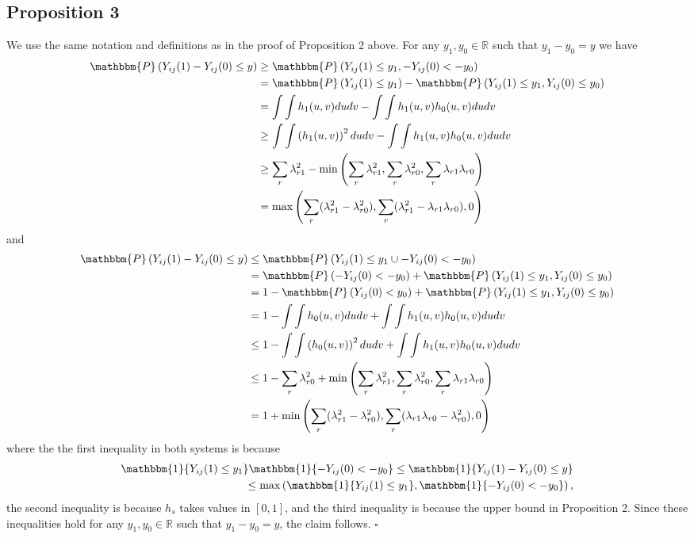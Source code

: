 \documentclass[12pt]{article}
\theoremstyle{definition}
\begin{document}
\subsection{Proposition 3}
We use the same notation and definitions as in the proof of Proposition 2 above. For any $y_{1},y_{0} \in \mathbb{R}$ such that $y_{1}-y_{0} = y$ we have
\begin{align*}
\mathbbm{P}\left(Y_{ij}(1) - Y_{ij}(0) \leq y\right) &\geq \mathbbm{P}\left(Y_{ij}(1) \leq y_1, -Y_{ij}(0) < -y_0\right)\\
&=  \mathbbm{P}\left(Y_{ij}(1) \leq y_1\right) -  \mathbbm{P}\left(Y_{ij}(1) \leq y_1, Y_{ij}(0) \leq  y_0\right)\\
&= \int\int h_{1}(u,v) dudv - \int\int h_{1}(u,v)h_{0}(u,v) dudv \\
&\geq \int\int \left(h_{1}(u,v)\right)^2 dudv - \int\int h_{1}(u,v)h_{0}(u,v) dudv \\
&\geq \sum_{r}\lambda_{r1}^{2} - \min\left(\sum_{r}\lambda_{r1}^{2},\sum_{r}\lambda_{r0}^{2},\sum_{r}\lambda_{r1}\lambda_{r0}\right) \\
&= \max\left(\sum_{r}(\lambda_{r1}^{2}-\lambda_{r0}^{2}),\sum_{r}(\lambda_{r1}^{2} - \lambda_{r1}\lambda_{r0}),0\right)
\end{align*}
and
\begin{align*}
\mathbbm{P}\left(Y_{ij}(1) - Y_{ij}(0) \leq y\right) 
 &\leq  \mathbbm{P}\left(Y_{ij}(1) \leq y_1 \cup -Y_{ij}(0) < -y_0\right)\\
 &= \mathbbm{P}\left( -Y_{ij}(0) < -y_0 \right) +  \mathbbm{P}\left(Y_{ij}(1) \leq y_1, Y_{ij}(0) \leq y_0\right)\\
&= 1 -  \mathbbm{P}\left( Y_{ij}(0) < y_0 \right)  +   \mathbbm{P}\left(Y_{ij}(1) \leq y_1, Y_{ij}(0) \leq y_0\right)\\
&= 1 - \int\int h_{0}(u,v) dudv + \int\int h_{1}(u,v)h_{0}(u,v) dudv \\
&\leq 1 -  \int\int \left(h_{0}(u,v)\right)^2 dudv + \int\int h_{1}(u,v)h_{0}(u,v) dudv \\
&\leq 1 - \sum_{r}\lambda_{r0}^{2} + \min\left(\sum_{r}\lambda_{r1}^{2},\sum_{r}\lambda_{r0}^{2},\sum_{r}\lambda_{r1}\lambda_{r0}\right)  \\
&= 1 + \min\left(\sum_{r}(\lambda_{r1}^{2}-\lambda_{r0}^{2}),\sum_{r}(\lambda_{r1}\lambda_{r0} - \lambda_{r0}^{2}),0\right)
\end{align*}
where the the first inequality in both systems is because 
\begin{align*}
\mathbbm{1}\{Y_{ij}(1) \leq y_{1}\}\mathbbm{1}\{-Y_{ij}(0) < -y_{0}\} 
\leq \mathbbm{1}\{Y_{ij}(1)-Y_{ij}(0) \leq y\}\\
\leq \max\left(\mathbbm{1}\{ Y_{ij}(1) \leq y_{1} \},\mathbbm{1}\{-Y_{ij}(0) < -y_{0}\}\right),
\end{align*}
the second inequality is because $h_{s}$ takes values in $[0,1]$, and the third inequality is because the upper bound in Proposition 2. Since these inequalities hold for any $y_{1},y_{0} \in \mathbb{R}$ such that $y_{1} - y_{0} = y$, the claim follows. $\square$
\end{document}
